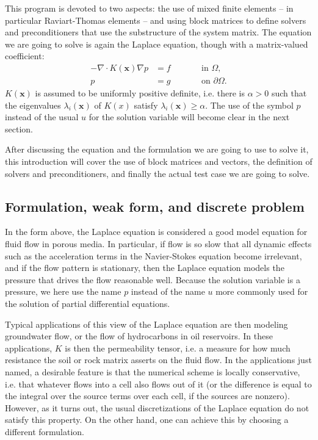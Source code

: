 \documentclass{article}
\renewcommand{\vec}[1]{\mathbf{#1}}
\begin{document}
This program is devoted to two aspects: the use of mixed finite elements -- in
particular Raviart-Thomas elements -- and using block matrices to define
solvers and preconditioners that use the substructure of the system
matrix. The equation we are going to solve is again the Laplace equation,
though with a matrix-valued coefficient:
\begin{align*}
  -\nabla \cdot K(\vec x) \nabla p &= f \qquad && \text{in $\Omega$}, \\
  p &= g && \text{on $\partial\Omega$}.
\end{align*}
$K(\vec x)$ is assumed to be uniformly positive definite, i.e. there is
$\alpha>0$ such that the eigenvalues $\lambda_i(\vec x)$ of $K(x)$ satisfy
$\lambda_i(\vec x)\ge \alpha$. The use of the symbol $p$ instead of the usual
$u$ for the solution variable will become clear in the next section.

After discussing the equation and the formulation we are going to use to solve
it, this introduction will cover the use of block matrices and vectors, the
definition of solvers and preconditioners, and finally the actual test case we
are going to solve.

\subsection*{Formulation, weak form, and discrete problem}

In the form above, the Laplace equation is considered a good model equation
for fluid flow in porous media. In particular, if flow is so slow that all
dynamic effects such as the acceleration terms in the Navier-Stokes equation
become irrelevant, and if the flow pattern is stationary, then the Laplace
equation models the pressure that drives the flow reasonable well. Because the
solution variable is a pressure, we here use the name $p$ instead of the
name $u$ more commonly used for the solution of partial differential equations.

Typical applications of this view of the Laplace equation are then modeling
groundwater flow, or the flow of hydrocarbons in oil reservoirs. In these
applications, $K$ is then the permeability tensor, i.e. a measure for how much
resistance the soil or rock matrix asserts on the fluid flow. In the
applications just named, a desirable feature is that the numerical scheme is
locally conservative, i.e. that whatever flows into a cell also flows out of
it (or the difference is equal to the integral over the source terms over each
cell, if the sources are nonzero). However, as it turns out, the usual
discretizations of the Laplace equation do not satisfy this property. On the
other hand, one can achieve this by choosing a different formulation.
\end{document}
